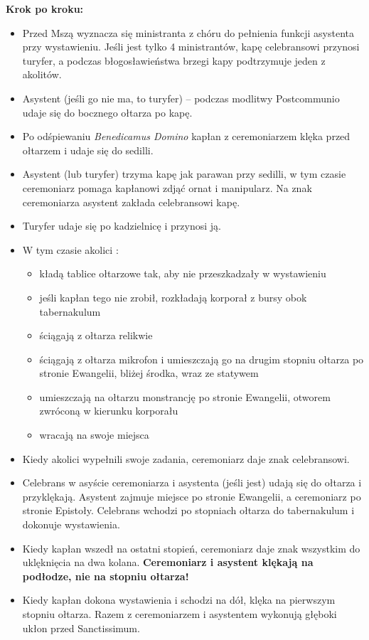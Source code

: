 		\textbf{Krok po kroku:}
		\begin{itemize}
			\item Przed Mszą wyznacza się ministranta z chóru do pełnienia funkcji asystenta przy wystawieniu. Jeśli jest tylko 4 ministrantów, kapę celebransowi przynosi turyfer, a podczas błogosławieństwa brzegi kapy podtrzymuje jeden z akolitów.
			\item Asystent (jeśli go nie ma, to turyfer) – podczas modlitwy Postcommunio udaje się do bocznego ołtarza po kapę.
			\item Po odśpiewaniu \textit{Benedicamus Domino} kapłan z ceremoniarzem klęka przed ołtarzem i udaje się do sedilli.
			\item Asystent (lub turyfer) trzyma kapę jak parawan przy sedilli, w tym czasie ceremoniarz pomaga kapłanowi zdjąć ornat i manipularz. Na znak ceremoniarza asystent zakłada celebransowi kapę.
			\item Turyfer udaje się po kadzielnicę i przynosi ją.
			\item W tym czasie akolici :
			\begin{itemize}
				\item kładą tablice ołtarzowe tak, aby nie przeszkadzały w wystawieniu
				\item jeśli kapłan tego nie zrobił, rozkładają korporał z bursy obok tabernakulum
				\item ściągają z ołtarza relikwie
				\item ściągają z ołtarza mikrofon i umieszczają go na drugim stopniu ołtarza po stronie Ewangelii, bliżej środka, wraz ze statywem
				\item umieszczają na ołtarzu monstrancję po stronie Ewangelii, otworem zwróconą w kierunku korporału
				\item wracają na swoje miejsca
			\end{itemize}
			\item Kiedy akolici wypełnili swoje zadania, ceremoniarz daje znak celebransowi.
			\item Celebrans w asyście ceremoniarza i asystenta (jeśli jest) udają się do ołtarza i przyklękają. Asystent zajmuje miejsce po stronie Ewangelii, a ceremoniarz po stronie Epistoły. Celebrans wchodzi po stopniach ołtarza do tabernakulum i dokonuje wystawienia.
			\item Kiedy kapłan wszedł na ostatni stopień, ceremoniarz daje znak wszystkim do uklęknięcia na dwa kolana.
			\textbf{Ceremoniarz i asystent klękają na podłodze, nie na stopniu ołtarza!}
			\item  Kiedy kapłan dokona wystawienia i schodzi na dół, klęka na pierwszym stopniu ołtarza. Razem z ceremoniarzem i asystentem wykonują głęboki ukłon przed Sanctissimum.

\end{itemize}
